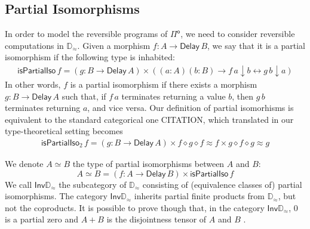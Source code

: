 \documentclass[runningheads]{llncs}
\newcommand{\Pio}{$\mathsf{\Pi}^{\mathsf{o}}$}
\newcommand{\Inv}{\mathsf{Inv}}
\newcommand{\Delay}{\mathsf{Delay}\,}
\newcommand{\dn}{\downarrow}
\newcommand{\D}{\mathbb{D}}
\newcommand{\Dapprox}{\mathbb{D}_{\approx}}
\newcommand{\piso}{\mathsf{isPartialIso}}
\newcommand{\pisoalt}{\mathsf{isPartialIso}_2}
\begin{document}
\subsection{Partial Isomorphisms}
\label{sec:isos}

In order to model the reversible programs of \Pio, we need to consider
reversible computations in $\Dapprox$. Given a morphism $f : A \to
\Delay B$, we say that it is a partial isomorphism if the following
type is inhabited:
\begin{align*}
\piso \,f = (g : B \to \Delay A) \times \left( (a : A) (b : B) \to  f
  \,a \dn b \leftrightarrow g \,b \dn a  \right)  
\end{align*}
In other words, $f$ is a partial isomorphism if there exists a
morphism $g : B \to \Delay A$ such that, if $f\,a$ terminates
returning a value $b$, then $g\,b$ terminates returning $a$, and vice
versa. 
Our definition of partial isomorhisms is equivalent to the standard
categorical one CITATION, which translated in our type-theoretical
setting becomes
\begin{align*}
\pisoalt \,f = (g : B \to \Delay A) \times f \diamond g \diamond
  f \approx f \times g \diamond f \diamond g \approx g 
\end{align*}



We denote $A \simeq B$ the type of partial isomorphisms between
$A$ and $B$:
\[
A \simeq B = (f : A \to \Delay B) \times \piso \,f
\]
We call $\Inv \Dapprox$ the subcategory of $\Dapprox$ consisting
of (equivalence classes of) partial isomorphisms. The category
$\Inv\Dapprox$ inherits partial finite products from $\Dapprox$, but
not the coproducts. It is possible to prove though that, in the category
$\Inv\Dapprox$, 0 is a partial zero and $A + B$ is the disjointness
tensor of $A$ and $B$ \cite{Giles}. 

\end{document}
